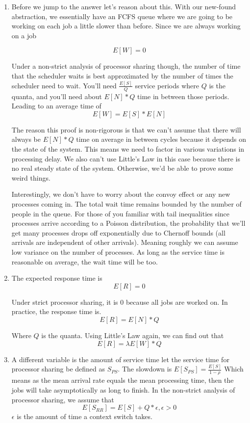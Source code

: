 \begin{enumerate}
  \item Before we jump to the answer let's reason about this.
    With our new-found abstraction, we essentially have an FCFS queue where we are going to be working on each job a little slower than before.
    Since we are always working on a job

    \[
    E[W] = 0
    \]

  Under a non-strict analysis of processor sharing though, the number of time that the scheduler waits is best approximated by the number of times the scheduler need to wait.
  You'll need $\frac{E[S]}{Q}$ service periods where $Q$ is the quanta, and you'll need about $E[N] * Q$ time in between those periods.
  Leading to an average time of
  \[
  E[W] = E[S] * E[N]
  \]

  The reason this proof is non-rigorous is that we can't assume that there will always be $E[N] * Q$ time on average in between cycles because it depends on the state of the system.
  This means we need to factor in various variations in processing delay.
  We also can't use Little's Law in this case because there is no real steady state of the system.
  Otherwise, we'd be able to prove some weird things.

  Interestingly, we don't have to worry about the convoy effect or any new processes coming in.
  The total wait time remains bounded by the number of people in the queue.
  For those of you familiar with tail inequalities since processes arrive according to a Poisson distribution, the probability that we'll get many processes drops off exponentially due to Chernoff bounds (all arrivals are independent of other arrivals).
  Meaning roughly we can assume low variance on the number of processes.
  As long as the service time is reasonable on average, the wait time will be too.

\item The expected response time is
  \[
  E[R] = 0
  \]

  Under strict processor sharing, it is 0 because all jobs are worked on.
  In practice, the response time is.
  \[
  E[R] = E[N] * Q
  \]

  Where $Q$ is the quanta.
  Using Little's Law again, we can find out that
  \[
  E[R] = \lambda E[W] * Q
  \]
\item A different variable is the amount of service time let the service time for processor sharing be defined as $S_{PS}$.
  The slowdown is $E[S_{PS}] = \frac{E[S]}{1 - \rho}$
  Which means as the mean arrival rate equals the mean processing time, then the jobs will take asymptotically as long to finish.
  In the non-strict analysis of processor sharing, we assume that
  \[
    E[S_{RR}] = E[S] + Q * \epsilon, \epsilon > 0
  \]
    $\epsilon$ is the amount of time a context switch takes.


\end{enumerate}
